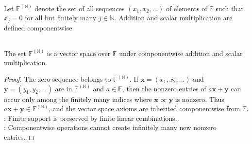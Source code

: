 \begin{definition} \\
Let $\mathbb{F}^{(\mathbb{N})}$ denote the set of all sequences $(x_1,x_2,\ldots)$ of elements of $\mathbb{F}$ such that $x_j=0$ for all but finitely many $j\in\mathbb{N}$. Addition and scalar multiplication are defined componentwise.
\end{definition}

\begin{proposition} \label{prop:finitely-nonzero-sequences-vector-space} \\
The set $\mathbb{F}^{(\mathbb{N})}$ is a vector space over $\mathbb{F}$ under componentwise addition and scalar multiplication.
\begin{proof}
The zero sequence belongs to $\mathbb{F}^{(\mathbb{N})}$. If $\mathbf{x}=(x_1,x_2,\ldots)$ and $\mathbf{y}=(y_1,y_2,\ldots)$ are in $\mathbb{F}^{(\mathbb{N})}$ and $a\in\mathbb{F}$, then the nonzero entries of $a\mathbf{x}+\mathbf{y}$ can occur only among the finitely many indices where $\mathbf{x}$ or $\mathbf{y}$ is nonzero. Thus $a\mathbf{x}+\mathbf{y}\in\mathbb{F}^{(\mathbb{N})}$, and the vector space axioms are inherited componentwise from $\mathbb{F}$.\\
: Finite support is preserved by finite linear combinations.\\
: Componentwise operations cannot create infinitely many new nonzero entries.
\end{proof}
\end{proposition}

